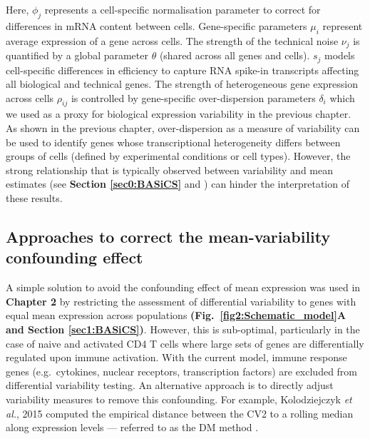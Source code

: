Here, $\phi_j$ represents a cell-specific normalisation parameter to correct for differences in mRNA content between cells. 
Gene-specific parameters $\mu_i$ represent average expression of a gene across cells. 
The strength of the technical noise $\nu_j$ is quantified by a global parameter $\theta$ (shared across all genes and cells). 
$s_j$ models cell-specific differences in efficiency to capture RNA spike-in transcripts affecting all biological and technical genes. 
The strength of heterogeneous gene expression across cells $\rho_{ij}$ is controlled by gene-specific over-dispersion parameters $\delta_i$ which we used as a proxy for biological expression variability in the previous chapter. 
As shown in the previous chapter, over-dispersion as a measure of variability can be used to identify genes whose transcriptional heterogeneity differs between groups of cells (defined by experimental conditions or cell types). 
However, the strong relationship that is typically observed between variability and mean estimates (see \textbf{Section \ref{sec0:BASiCS}} and \citep{Brennecke2013}) can hinder the interpretation of these results. 

\newpage

\subsection{Approaches to correct the mean-variability confounding effect}

A simple solution to avoid the confounding effect of mean expression was used in \textbf{Chapter 2} by restricting the assessment of differential variability to genes with equal mean expression across populations \textbf{(Fig.~\ref{fig2:Schematic_model}A and Section \ref{sec1:BASiCS})}. 
However, this is sub-optimal, particularly in the case of naive and activated CD4\plus{} T cells where large sets of genes are differentially regulated upon immune activation. 
With the current model, immune response genes (e.g.~cytokines, nuclear receptors, transcription factors) are excluded from differential variability testing. 
An alternative approach is to directly adjust variability measures to remove this confounding. 
For example, Kolodziejczyk \emph{et al.}, 2015 computed the empirical distance between the \gls{CV2} to a rolling median along expression levels --- referred to as the DM method \citep{Newman2006, Kolodziejczyk2015cell}.  \\

